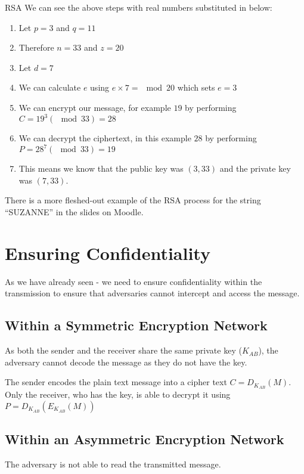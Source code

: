 \begin{example}{RSA}
We can see the above steps with real numbers substituted in below:
\begin{enumerate}
    \item Let $p=3$ and $q=11$
    \item Therefore $n=33$ and $z=20$
    \item Let $d=7$
    \item We can calculate $e$ using  $e \times 7 = \mod 20$ which sets $e=3$
    \item We can encrypt our message, for example $19$ by performing $C = 19^3(\mod 33)=28$
    \item We can decrypt the ciphertext, in this example $28$ by performing $P=28^7(\mod 33)=19$
    \item This means we know that the public key was $(3,33)$ and the private key was $(7,33)$.
\end{enumerate}
\end{example}

\begin{extlink}
There is a more fleshed-out example of the RSA process for the string ``SUZANNE'' in the slides on Moodle.
\end{extlink}

\section{Ensuring Confidentiality}
As we have already seen - we need to ensure confidentiality within the transmission to ensure that adversaries cannot intercept and access the message.

\subsection{Within a Symmetric Encryption Network}
As both the sender and the receiver share the same private key ($K_{AB}$), the adversary cannot decode the message as they do not have the key. 

The sender encodes the plain text message into a cipher text $C=D_{K_{AB}}(M)$. Only the receiver, who has the key, is able to decrypt it using $P=D_{K_{AB}}(E_{K_{AB}}(M))$

\subsection{Within an Asymmetric Encryption Network}
The adversary is not able to read the transmitted message. 

